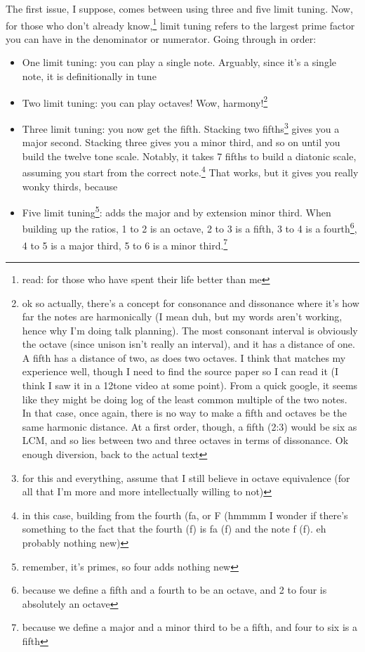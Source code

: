 \documentclass[12pt]{article}[titlepage]
\newcommand{\1}{\={a}}
\newcommand{\2}{\={e}}
\newcommand{\3}{\={\i}}
\newcommand{\4}{\=o}
\newcommand{\5}{\=u}
\newcommand{\6}{\={A}}
\renewcommand{\,}{\textsuperscript{,}}
\begin{document}
The first issue, I suppose, comes between using three and five limit tuning.
Now, for those who don't already know,\footnote{read: for those who have spent their life better than me} limit tuning refers to the largest prime factor you can have in the denominator or numerator.
Going through in order:
\begin{itemize}
\item One limit tuning: you can play a single note. Arguably, since it's a single note, it is definitionally in tune
\item Two limit tuning: you can play octaves! Wow, harmony!\footnote{ok so actually, there's a concept for consonance and dissonance where it's how far the notes are harmonically (I mean duh, but my words aren't working, hence why I'm doing talk planning).
The most consonant interval is obviously the octave (since unison isn't really an interval), and it has a distance of one.
A fifth has a distance of two, as does two octaves. I think that matches my experience well, though I need to find the source paper so I can read it (I think I saw it in a 12tone video at some point). From a quick google, it seems like they might be doing log of the least common multiple of the two notes.
In that case, once again, there is no way to make a fifth and octaves be the same harmonic distance.
At a first order, though, a fifth (2:3) would be six as LCM, and so lies between two and three octaves in terms of dissonance.
Ok enough diversion, back to the actual text}
\item Three limit tuning: you now get the fifth.
Stacking two fifths\footnote{for this and everything, assume that I still believe in octave equivalence (for all that I'm more and more intellectually willing to not)} gives you a major second.
Stacking three gives you a minor third, and so on until you build the twelve tone scale.
Notably, it takes 7 fifths to build a diatonic scale, assuming you start from the correct note.\footnote{in this case, building from the fourth (fa, or F (hmmmm I wonder if there's something to the fact that the fourth (f) is fa (f) and the note f (f). eh probably nothing new)}
That works, but it gives you really wonky thirds, because
\item Five limit tuning\footnote{remember, it's primes, so four adds nothing new}: adds the major and by extension minor third.
When building up the ratios, 1 to 2 is an octave, 2 to 3 is a fifth, 3 to 4 is a fourth\footnote{because we define a fifth and a fourth to be an octave, and 2 to four is absolutely an octave}, 4 to 5 is a major third, 5 to 6 is a minor third.\footnote{because we define a major and a minor third to be a fifth, and four to six is a fifth}

\end{itemize}
\end{document}
